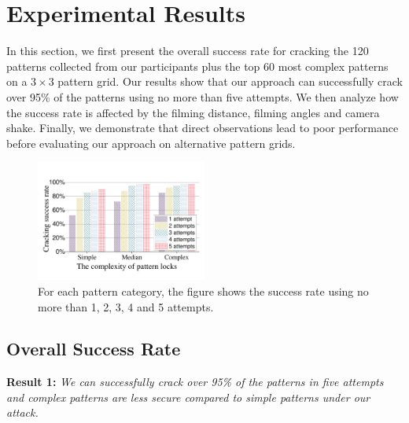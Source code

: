 \section{Experimental Results}
    In this section, we first present the overall success rate for cracking
    the 120 patterns collected from our participants plus the top 60 most complex patterns
    on a $3\times3$ pattern grid.
    Our results show that our approach can successfully crack over 95\% of the
    patterns using no more than five attempts. We then analyze how the
     success rate is affected by the filming distance, filming angles and
    camera shake. Finally, we demonstrate that direct observations lead to poor
    performance before evaluating our approach on alternative pattern grids.

\begin{figure}[!t]
    \centering
    \includegraphics[width=0.5\textwidth]{fig/10.pdf}
    \caption{For each pattern category, the figure shows the success rate using no more than 1, 2, 3, 4 and 5 attempts.}
    \label{fig:fig10}
\end{figure}

    \subsection{Overall Success Rate \label{sec:overall_rate}}

    \noindent \textbf{Result 1:}  \emph{We can successfully crack over 95\% of the patterns in five attempts and complex patterns are less secure compared to simple patterns under our attack.}

